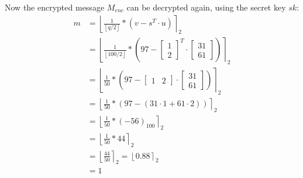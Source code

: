 Now the encrypted message $M_{enc}$ can be decrypted again, using the secret key $sk$:
\begin{align*}
  m & = \left\lfloor \frac{1}{\left\lfloor q/2\right\rfloor} *(v-s^T \cdot u)\right\rceil _2 \\
    & = \left\lfloor \frac{1}{\left\lfloor 100/2\right\rfloor} * \left (97-
  \begin{bmatrix}
      1 \\
      2
    \end{bmatrix}^T
  \cdot
  \begin{bmatrix}
      31 \\
      61
    \end{bmatrix} \right )\right\rceil _2                                                      \\
    & = \left\lfloor \frac{1}{50} * \left (97-
  \begin{bmatrix}
      1 & 2 
    \end{bmatrix}
  \cdot 
  \begin{bmatrix}
      31 \\ 
      61
    \end{bmatrix}\right )\right\rceil _2                                                       \\
    & = \left\lfloor \frac{1}{50} * (97-(31 \cdot 1 + 61 \cdot 2))\right\rceil _2            \\
    & = \left\lfloor \frac{1}{50} * (-56)_{100}\right\rceil _2                               \\
    & = \left\lfloor \frac{1}{50} * 44\right\rceil _2                                        \\
    & = \left\lfloor \frac{44}{50}\right\rceil _2  = \left\lfloor 0.88\right\rceil _2        \\
    & = 1                                                                                    \\
\end{align*}